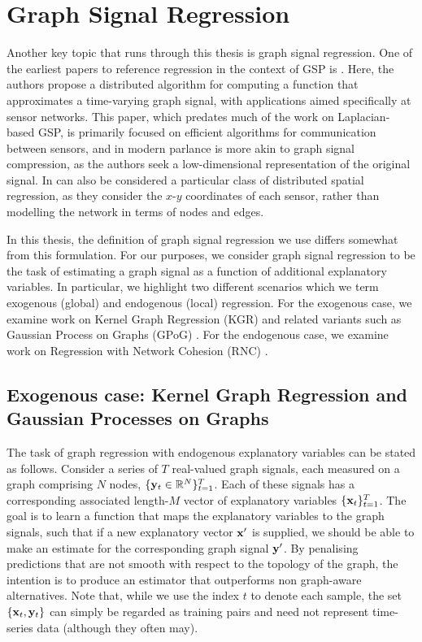 \section{Graph Signal Regression}

Another key topic that runs through this thesis is graph signal regression. One of the earliest papers to reference regression in the context of GSP is \cite{Guestrin2004}. Here, the authors propose a distributed algorithm for computing a function that approximates a time-varying graph signal, with applications aimed specifically at sensor networks. This paper, which predates much of the work on Laplacian-based GSP, is primarily focused on efficient algorithms for communication between sensors, and in modern parlance is more akin to graph signal compression, as the authors seek a low-dimensional representation of the original signal. In can also be considered a particular class of distributed spatial regression, as they consider the $x$-$y$ coordinates of each sensor, rather than modelling the network in terms of nodes and edges. 

In this thesis, the definition of graph signal regression we use differs somewhat from this formulation. For our purposes, we consider graph signal regression to be the task of estimating a graph signal as a function of additional explanatory variables. In particular, we highlight two different scenarios which we term exogenous (global) and endogenous (local) regression. For the exogenous case, we examine work on Kernel Graph Regression (KGR) \citep{Venkitaraman2019} and related variants such as Gaussian Process on Graphs (GPoG) \cite{Venkitaraman2020}. For the endogenous case, we examine work on Regression with Network Cohesion (RNC) \citep{Li2019}. 


\subsection{Exogenous case: Kernel Graph Regression and Gaussian Processes on Graphs}

The task of graph regression with endogenous explanatory variables can be stated as follows. Consider a series of $T$ real-valued graph signals, each measured on a graph comprising $N$ nodes, $\{\mathbf{y}_t \in \mathbb{R}^N\}_{t=1}^T$. Each of these signals has a corresponding associated length-$M$ vector of explanatory variables $\{\mathbf{x}_t\}_{t=1}^T$. The goal is to learn a function that maps the explanatory variables to the graph signals, such that if a new explanatory vector $\mathbf{x}'$ is supplied, we should be able to make an estimate for the corresponding graph signal $\mathbf{y}'$. By penalising predictions that are not smooth with respect to the topology of the graph, the intention is to produce an estimator that outperforms non graph-aware alternatives. Note that, while we use the index $t$ to denote each sample, the set $\{\mathbf{x}_t, \mathbf{y}_t\}$ can simply be regarded as training pairs and need not represent time-series data (although they often may). 


